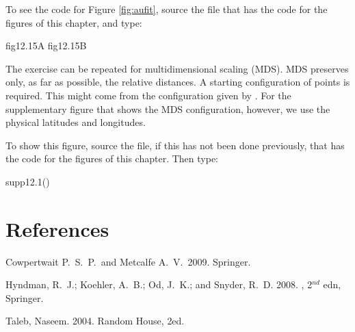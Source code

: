 To see the code for Figure \ref{fig:aufit}, source the file that has the
code for the figures of this chapter, and type:
\begin{Schunk}
\begin{Sinput}
fig12.15A
fig12.15B
\end{Sinput}
\end{Schunk}

The exercise can be repeated for multidimensional scaling (MDS). MDS
preserves only, as far as possible, the relative distances.  A
starting configuration of points is required.  This might come from
the configuration given by .  For the supplementary
figure  that shows the MDS configuration, however, we
use the physical latitudes and longitudes.

To show this figure, source the file, if this has not been done
previously, that has the code for the figures of this chapter. Then
type:
\begin{Schunk}
\begin{Sinput}
supp12.1()
\end{Sinput}
\end{Schunk}

\section*{References}
\begin{itemizz}
\item[] Cowpertwait P.~S.~P.\ and Metcalfe A.~V.\ 2009.
 Springer.
\item[]
Hyndman, R.~J.; Koehler, A.~B.; Od, J.~K.; and Snyder, R.~D. 2008.
, 2$^{nd}$ edn, Springer.
\item[] Taleb, Naseem. 2004.   Random House, 2ed.
\end{itemizz}
